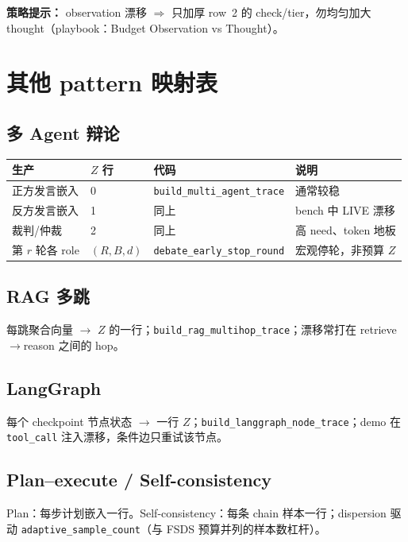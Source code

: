 \documentclass[11pt,a4paper]{ctexart}
\begin{document}
\noindent\textbf{策略提示：} observation 漂移 $\Rightarrow$ 只加厚 row~2 的 check/tier，勿均匀加大 thought（playbook：Budget Observation vs Thought）。

\section{其他 pattern 映射表}

\subsection{多 Agent 辩论}
\begin{center}
\small
\begin{tabular}{@{}llll@{}}
\toprule
生产 & $Z$ 行 & 代码 & 说明 \\
\midrule
正方发言嵌入 & 0 & \texttt{build\_multi\_agent\_trace} & 通常较稳 \\
反方发言嵌入 & 1 & 同上 & bench 中 LIVE 漂移 \\
裁判/仲裁 & 2 & 同上 & 高 need、token 地板 \\
第 $r$ 轮各 role & $(R,B,d)$ & \texttt{debate\_early\_stop\_round} & 宏观停轮，非预算 $Z$ \\
\bottomrule
\end{tabular}
\end{center}

\subsection{RAG 多跳}
每跳聚合向量 $\rightarrow$ $Z$ 的一行；\texttt{build\_rag\_multihop\_trace}；漂移常打在 retrieve$\rightarrow$reason 之间的 hop。

\subsection{LangGraph}
每个 checkpoint 节点状态 $\rightarrow$ 一行 $Z$；\texttt{build\_langgraph\_node\_trace}；demo 在 \texttt{tool\_call} 注入漂移，条件边只重试该节点。

\subsection{Plan--execute / Self-consistency}
Plan：每步计划嵌入一行。Self-consistency：每条 chain 样本一行；dispersion 驱动 \texttt{adaptive\_sample\_count}（与 FSDS 预算并列的样本数杠杆）。
\end{document}
